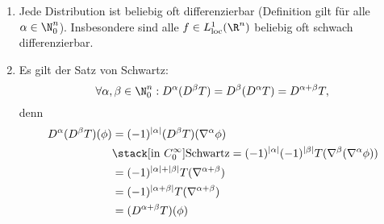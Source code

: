 \begin{nt} \label{5.14}
	\begin{enumerate}[1)]
		\item
			Jede Distribution ist beliebig oft differenzierbar (Definition gilt für alle $\alpha \in \N_0^n$).
			Insbesondere sind alle $f \in L_{\text{loc}}^1(\R^n)$ beliebig oft schwach differenzierbar.
		\item
			Es gilt der Satz von Schwartz:
			\[
				\forall \alpha, \beta \in \N_0^n : D^\alpha (D^\beta T) = D^\beta (D^\alpha T) = D^{\alpha + \beta} T,
			\]
			denn
			\begin{align*}
				D^\alpha (D^\beta T)(\phi)
				&= (-1)^{|\alpha|}(D^\beta T) (\nabla^\alpha \phi) \\
				&\stack[\text{in $C_0^\infty$}]{\text{Schwartz}}= (-1)^{|\alpha|}(-1)^{|\beta|} T(\nabla^\beta(\nabla^\alpha \phi)) \\
				&= (-1)^{|\alpha|+|\beta|} T(\nabla^{\alpha + \beta}) \\
				&= (-1)^{|\alpha + \beta|} T(\nabla^{\alpha + \beta}) \\
				&= (D^{\alpha + \beta} T)(\phi)
			\end{align*}
	\end{enumerate}
\end{nt}

